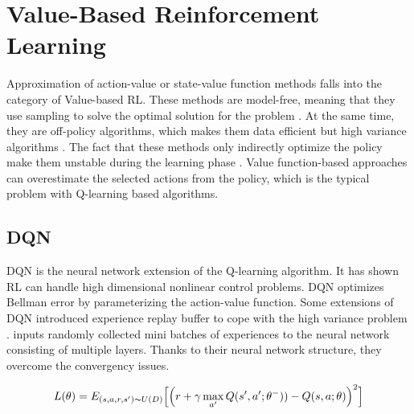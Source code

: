 \section{Value-Based Reinforcement Learning}

Approximation of action-value or state-value function methods falls into the category of Value-based RL. These methods are model-free, meaning that they use sampling to solve the optimal solution for the problem \cite{Mnih}. At the same time, they are off-policy algorithms, which makes them data efficient but high variance algorithms \cite{SpinningUp2018}. The fact that these methods only indirectly optimize the policy make them unstable during the learning phase \cite{Sutton2018}. Value function-based approaches can overestimate the selected actions from the policy, which is the typical problem with Q-learning based algorithms. 


\subsection{DQN}

DQN is the neural network extension of the Q-learning algorithm. It has shown RL can handle high dimensional nonlinear control problems. DQN optimizes Bellman error by parameterizing the action-value function. Some extensions of DQN introduced experience replay buffer to cope with the high variance problem \cite{Lin1993}. \cite{Mnih}  inputs randomly collected mini batches of experiences to the neural network consisting of multiple layers. Thanks to their neural network structure, they overcome the convergency issues.

\begin{equation}
    L(\theta) = E_{(s, a, r, s') \thicksim U(D)} \Big[\Big(r+ \gamma \max\limits_{a'}Q(s',a'; \theta^-)) - Q(s,a;\theta)\Big)^2\Big] 
\end{equation}

